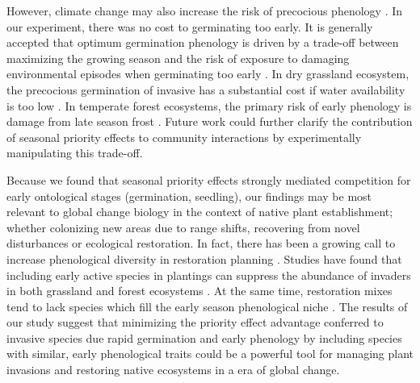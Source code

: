 \documentclass{article}[11pt]
\begin{document}
However, climate change may also increase the risk of precocious phenology \citep{Inouye:2000ud}. In our experiment, there was no cost to germinating too early. It is generally accepted that optimum germination phenology is driven by a trade-off between maximizing the growing season and the risk of exposure to damaging environmental episodes when germinating too early \citep{Augspurger:2017vu}. In dry grassland ecosystem, the precocious germination of invasive has a substantial cost if water availability is too low \citep{Wainwright_2011}. In temperate forest ecosystems, the primary risk of early phenology is damage from late season frost \citep{Kollas:2014vn}. Future work could further clarify the contribution of seasonal priority effects to community interactions by experimentally manipulating this trade-off.

Because we found that seasonal priority effects strongly mediated competition for early ontological stages (germination, seedling), our findings may be most relevant to global change biology in the context of native plant establishment; whether colonizing new areas due to range shifts, recovering from novel disturbances or ecological restoration. In fact, there has been a growing call to increase phenological diversity in restoration planning \citep{Hess:2019vn}. Studies have found that including early active species in plantings can suppress the abundance of invaders in both grassland \citep{Cleland:2013wo} and forest ecosystems \citep{Schuster:2020ww}. At the same time, restoration mixes tend to lack species which fill the early season phenological niche \citep{Havens:2016vo}. The results of our study suggest that minimizing the priority effect advantage conferred to invasive species due rapid germination and early phenology by including species with similar, early phenological traits could be a powerful tool for managing plant invasions and restoring native ecosystems in a era of global change.
\end{document}
